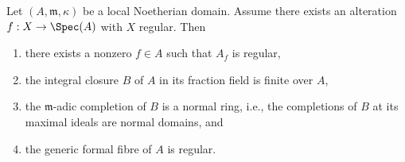 \begin{lemma}
\label{lemma-regular-alteration-implies-local}
Let $(A, \mathfrak m, \kappa)$ be a local Noetherian domain.
Assume there exists an alteration $f : X \to \Spec(A)$
with $X$ regular. Then
\begin{enumerate}
\item there exists a nonzero $f \in A$ such that $A_f$ is regular,
\item the integral closure $B$ of $A$ in its fraction field is finite over $A$,
\item the $\mathfrak m$-adic completion of $B$ is a normal ring, i.e., the
completions of $B$ at its maximal ideals are normal domains, and
\item the generic formal fibre of $A$ is regular.
\end{enumerate}
\end{lemma}

